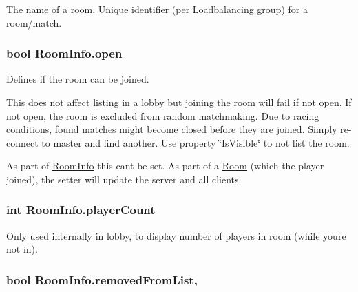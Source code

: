 The name of a room. Unique identifier (per Loadbalancing group) for a room/match.

\subsubsection[{\texorpdfstring{open}{open}}]{\setlength{\rightskip}{0pt plus 5cm}bool Room\+Info.\+open\hspace{0.3cm}{\ttfamily [get]}}\hypertarget{class_room_info_a870deed85986f1ca62f97ee3f50114ec}{}\label{class_room_info_a870deed85986f1ca62f97ee3f50114ec}


Defines if the room can be joined. 

This does not affect listing in a lobby but joining the room will fail if not open. If not open, the room is excluded from random matchmaking. Due to racing conditions, found matches might become closed before they are joined. Simply re-\/connect to master and find another. Use property \char`\"{}\+Is\+Visible\char`\"{} to not list the room. 

As part of \hyperlink{class_room_info}{Room\+Info} this can\textquotesingle{}t be set. As part of a \hyperlink{class_room}{Room} (which the player joined), the setter will update the server and all clients. 
\subsubsection[{\texorpdfstring{player\+Count}{playerCount}}]{\setlength{\rightskip}{0pt plus 5cm}int Room\+Info.\+player\+Count\hspace{0.3cm}{\ttfamily [get]}}\hypertarget{class_room_info_a211655578d31b9fed0817cad42e8f0b5}{}\label{class_room_info_a211655578d31b9fed0817cad42e8f0b5}


Only used internally in lobby, to display number of players in room (while you\textquotesingle{}re not in). 

\subsubsection[{\texorpdfstring{removed\+From\+List}{removedFromList}}]{\setlength{\rightskip}{0pt plus 5cm}bool Room\+Info.\+removed\+From\+List\hspace{0.3cm}{\ttfamily [get]}, {\ttfamily [set]}}\hypertarget{class_room_info_af0811895b3b40f2b64d243d5fd8fd362}{}\label{class_room_info_af0811895b3b40f2b64d243d5fd8fd362}


